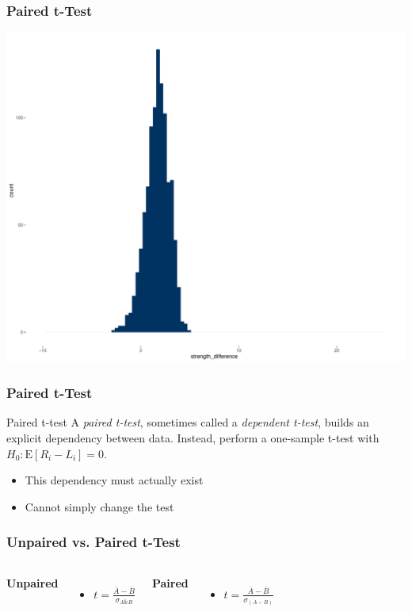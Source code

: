 \documentclass[12pt, block=fill]{beamer}
\newcommand{\E}{\text{E}}
\begin{document}
\begin{frame}
  \frametitle{Paired t-Test}
  \centering
    \includegraphics[width=.9\linewidth]{./figures/histogram_paired_rescaled.pdf}
\end{frame}

\begin{frame}
  \frametitle{Paired t-Test}
  \begin{block}{Paired t-test}
    A \textit{paired t-test}, sometimes called a \textit{dependent
      t-test}, builds an explicit dependency between data.
    Instead, perform a one-sample t-test with $H_0: \E[ R_{i}- L_{i}] = 0$.
  \end{block}
  \begin{itemize}
  \item This dependency must actually exist
  \item Cannot simply change the test
  \end{itemize}
\end{frame}

\begin{frame}
  \frametitle{Unpaired vs. Paired t-Test}

  \begin{columns}[t]
    \textbf{Unpaired}
    \begin{itemize}
      \item $t = \frac{\overline{A} - \overline{B}} {\sigma_{A\&B}}$
    \end{itemize}
    \textbf{Paired}
    \begin{itemize}
    \item $t = \frac{\overline{A} - \overline{B}}{\sigma_{(A - B)}}$
    \end{itemize}
  \end{columns}

\end{frame}
\end{document}
